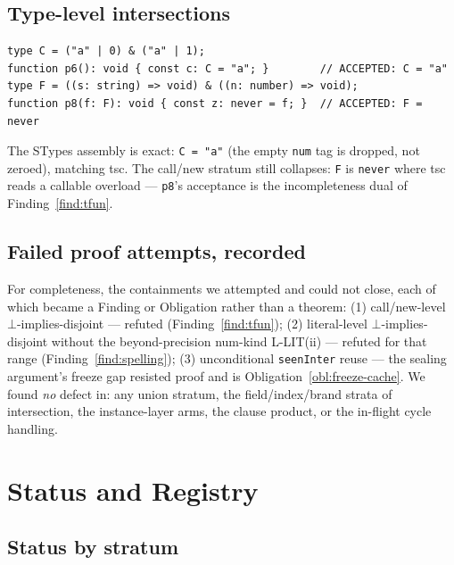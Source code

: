 \documentclass[11pt]{article}
\begin{document}
\subsection{Type-level intersections}
\begin{verbatim}
type C = ("a" | 0) & ("a" | 1);
function p6(): void { const c: C = "a"; }        // ACCEPTED: C = "a"
type F = ((s: string) => void) & ((n: number) => void);
function p8(f: F): void { const z: never = f; }  // ACCEPTED: F = never
\end{verbatim}
The STypes assembly is exact: \texttt{C = "a"} (the empty \texttt{num}
tag is dropped, not zeroed), matching tsc. The call/new stratum still
collapses: \texttt{F} is \texttt{never} where tsc reads a callable
overload — \texttt{p8}'s acceptance is the incompleteness dual of
Finding~\ref{find:tfun}.

\subsection{Failed proof attempts, recorded}
For completeness, the containments we attempted and could not close,
each of which became a Finding or Obligation rather than a theorem:
(1) call/new-level $\bot$-implies-disjoint — refuted
(Finding~\ref{find:tfun});
(2) literal-level $\bot$-implies-disjoint without the beyond-precision
num-kind L-LIT(ii) — refuted for that range
(Finding~\ref{find:spelling});
(3) unconditional \texttt{seenInter} reuse — the sealing argument's
freeze gap resisted proof and is Obligation~\ref{obl:freeze-cache}.
We found \emph{no} defect in: any union stratum, the field/index/brand
strata of intersection, the instance-layer arms, the clause product, or
the in-flight cycle handling.

\section{Status and Registry}
\label{sec:status}

\subsection{Status by stratum}
\end{document}
